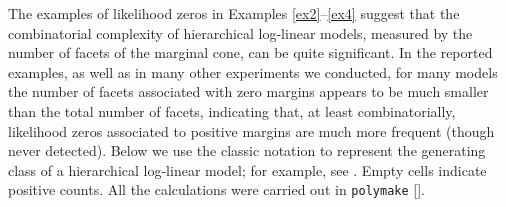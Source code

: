 \documentclass[aos,MSNbibl,nameyear,dvips]{arximspdf}
\begin{document}


The examples of likelihood zeros in Examples \ref{ex2}--\ref{ex4}
suggest that the combinatorial complexity of hierarchical log-linear
models, measured by the number of facets of the marginal cone, can be
quite significant. In the reported examples, as well as in many other
experiments we conducted, for many models the number of facets
associated with zero margins appears to be much smaller than the total
number of facets, indicating that, at least combinatorially, likelihood
zeros associated to positive margins are much more frequent (though
never detected). Below we use the classic notation to represent the
generating class of a hierarchical log-linear model; for example, see
\citet{BFH75}. Empty cells indicate positive counts. All the
calculations were carried out in {\tt polymake}
[\citet{polymake}].

\end{document}
